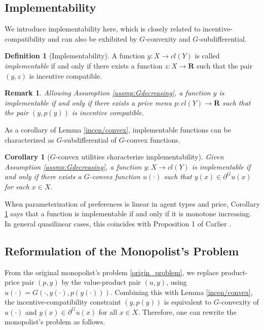 \documentclass[a4paper, 11pt]{amsart}
\numberwithin{equation}{section}
\theoremstyle{plain}
\newtheorem{corollary}[theorem]{Corollary}
\newtheorem{remark}[theorem]{Remark}
\theoremstyle{definition}
\newtheorem{definition}[theorem]{Definition}
\theoremstyle{remark}
\newcommand{\R}{\mathbf{R}}
\begin{document}
\subsection{Implementability}\label{subsection:implementability}
{We introduce implementability here, which is closely related to incentive-compatibility and can also be exhibited by $G$-convexity and $G$-subdifferential. %
	
	\begin{definition}[Implementability]
		A function $y: X \rightarrow cl(Y)$ is called \textit{implementable} if and only if there exists a function $z: X \rightarrow \R$  such that the pair $(y, z)$ is incentive compatible.
	\end{definition}
	
	\begin{remark}\label{rmk:implementability}
		Allowing Assumption \ref{assmp:Gdecreasing}, a function $y$ is implementable if and only if there exists a price menu $p: cl(Y) \rightarrow \R$ such that the pair $(y, p(y))$ is incentive compatible.
	\end{remark}
	
	
	As a corollary of Lemma \ref{incen/convex},  implementable functions can be characterized as $G$-subdifferential of $G$-convex functions. 
	
	
	\begin{corollary}[$G$-convex utilities characterize implementability]\label{cor:implementable}
		Given Assumption \ref{assmp:Gdecreasing}, a function $y: X \rightarrow cl(Y)$ is implementable if and only if there exists a $G$-convex function $u(\cdot)$ such that $y(x) \in \partial^G u(x)$ for each $x\in X$.
	\end{corollary}
}

When parameterization of preferences is linear in agent types and price, Corollary \ref{cor:implementable} says that a function is implementable if and only if it is monotone increasing. In general quasilinear cases, this coincides with Proposition 1 of Carlier \cite{Carlier01}. \medskip


\subsection{Reformulation of the Monopolist's Problem}\label{subsection:reformulation}
From the original monopolist's problem \eqref{origin_problem}, we replace product-price pair $(p,y)$ by the value-product pair $(u,y)$, using $u(\cdot) = G(\cdot, y(\cdot), p(y(\cdot)))$. %
Combining this with Lemma \ref{incen/convex}, the incentive-compatibility constraint $(y,p(y))$ is equivalent to $G$-convexity of $u(\cdot)$ and $y(x) \in \partial^G u(x)$ for all $x\in X$. Therefore, one can rewrite the monopolist's problem as follows.
\end{document}
